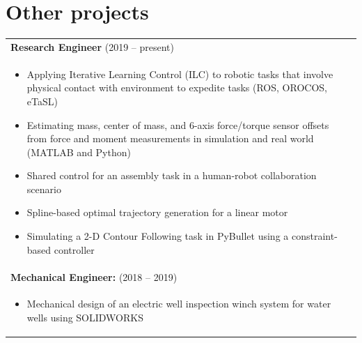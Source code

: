 \documentclass[lighthipster]{simplehipstercv}
\begin{document}
	\section*{Other projects}
	\vspace{-0.4cm}
	
	\begin{table}[h]
		\centering
		\begin{tabularx}{\linewidth}{X} %
			\textbf{Research Engineer} (2019 -- present) \\
			\vspace{-0.3cm}
			\begin{itemize}[leftmargin=1em, itemsep=0pt, topsep=0pt]
				\item Applying Iterative Learning Control (ILC) to robotic tasks that involve physical contact with environment to expedite tasks (ROS, OROCOS, eTaSL)
				\item Estimating mass, center of mass, and 6-axis force/torque sensor offsets from force and moment measurements in simulation and real world (MATLAB and Python)
				\item Shared control for an assembly task in a human-robot collaboration scenario
				\item Spline-based optimal trajectory generation for a linear motor
				\item Simulating a 2-D Contour Following task in PyBullet using a constraint-based controller
			\end{itemize} \\
			
			\vspace{0.01cm}
			\textbf{Mechanical Engineer:} (2018 -- 2019) \\
			\vspace{-0.3cm}
			\begin{itemize}[leftmargin=1em, itemsep=0pt, topsep=0pt]
				\item Mechanical design of an electric well inspection winch system for water wells using SOLIDWORKS
			\end{itemize} \\
			

\end{tabularx}
\end{table}
\end{document}
